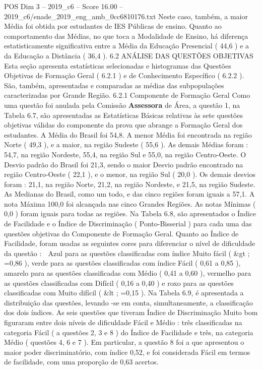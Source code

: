 \begin{textsample}{POS Dim 3 – 2019\_c6 – Score 16.00 – 2019\_c6/enade\_2019\_eng\_amb\_0cc6810176.txt}
Neste caso, também, a maior Média foi obtida por estudantes de IES Públicas de ensino.
Quanto ao comportamento das Médias, no que toca a Modalidade de Ensino, há diferença estatisticamente significativa entre a Média da Educação Presencial ( 44,6 ) e a da Educação a Distância ( 36,4 ). 6.2 ANÁLISE DAS QUESTÕES OBJETIVAS Esta seção apresenta estatísticas selecionadas e histogramas das Questões Objetivas de Formação Geral ( 6.2.1 ) e de Conhecimento Específico ( 6.2.2 ).
São, também, apresentadas e comparadas as médias das subpopulações caracterizadas por Grande Região. 6.2.1 Componente de Formação Geral Como uma questão foi anulada pela Comissão \textbf{Assessora} de Área, a questão 1, na Tabela 6.7, são apresentadas as Estatísticas Básicas relativas às sete questões objetivas válidas do componente da prova que abrange a Formação Geral dos estudantes.
A Média do Brasil foi 54,8.
A menor Média foi encontrada na região Norte ( 49,3 ), e a maior, na região Sudeste ( 55,6 ).
As demais Médias foram : 54,7, na região Nordeste, 55,4, na região Sul e 55,0, na região Centro-Oeste.
O Desvio padrão do Brasil foi 21,3, sendo o maior Desvio padrão encontrado na região Centro-Oeste ( 22,1 ), e o menor, na região Sul ( 20,0 ).
Os demais desvios foram : 21,1, na região Norte, 21,2, na região Nordeste, e 21,5, na região Sudeste.
As Medianas do Brasil, como um todo, e das cinco regiões foram iguais a 57,1.
A nota Máxima 100,0 foi alcançada nas cinco Grandes Regiões.
As notas Mínimas ( 0,0 ) foram iguais para todas as regiões.
Na Tabela 6.8, são apresentados o Índice de Facilidade e o Índice de Discriminação ( Ponto-Bisserial ) para cada uma das questões objetivas do Componente de Formação Geral.
Quanto ao Índice de Facilidade, foram usadas as seguintes cores para diferenciar o nível de dificuldade da questão :  Azul para as questões classificadas com índice Muito fácil ( \&gt ; =0,86 ), verde para as questões classificadas com índice Fácil ( 0,61 a 0,85 ), amarelo para as questões classificadas com Médio ( 0,41 a 0,60 ), vermelho para as questões classificadas com Difícil ( 0,16 a 0,40 ) e roxo para as questões classificadas com Muito difícil ( \&lt ; =0,15 ).
Na Tabela 6.9, é apresentada a distribuição das questões, levando -se em conta, simultaneamente, a classificação dos dois índices.
As seis questões que tiveram Índice de Discriminação Muito bom figuraram entre dois níveis de dificuldade Fácil e Médio : três classificadas na categoria Fácil ( a questões 2, 3 e 8 ) do Índice de Facilidade e três, na categoria Médio ( questões 4, 6 e 7 ).
Em particular, a questão 8 foi a que apresentou o maior poder discriminatório, com índice 0,52, e foi considerada Fácil em termos de facilidade, com uma proporção de 0,63 acertos.

\end{textsample}
